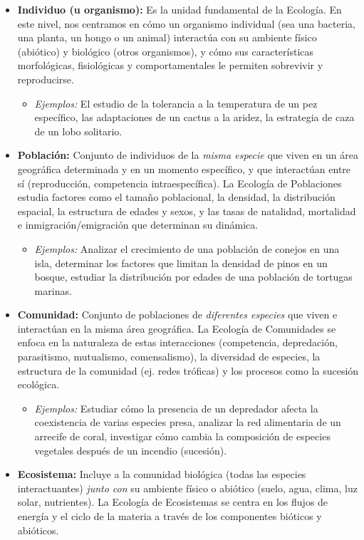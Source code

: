 \documentclass[
]{book}
\providecommand{\tightlist}{%
  \setlength{\itemsep}{0pt}\setlength{\parskip}{0pt}}
\begin{document}
\begin{itemize}
\tightlist
\item
  \textbf{Individuo (u organismo):} Es la unidad fundamental de la Ecología. En este nivel, nos centramos en cómo un organismo individual (sea una bacteria, una planta, un hongo o un animal) interactúa con su ambiente físico (abiótico) y biológico (otros organismos), y cómo sus características morfológicas, fisiológicas y comportamentales le permiten sobrevivir y reproducirse.

  \begin{itemize}
  \tightlist
  \item
    \emph{Ejemplos:} El estudio de la tolerancia a la temperatura de un pez específico, las adaptaciones de un cactus a la aridez, la estrategia de caza de un lobo solitario.
  \end{itemize}
\item
  \textbf{Población:} Conjunto de individuos de la \emph{misma especie} que viven en un área geográfica determinada y en un momento específico, y que interactúan entre sí (reproducción, competencia intraespecífica). La Ecología de Poblaciones estudia factores como el tamaño poblacional, la densidad, la distribución espacial, la estructura de edades y sexos, y las tasas de natalidad, mortalidad e inmigración/emigración que determinan su dinámica.

  \begin{itemize}
  \tightlist
  \item
    \emph{Ejemplos:} Analizar el crecimiento de una población de conejos en una isla, determinar los factores que limitan la densidad de pinos en un bosque, estudiar la distribución por edades de una población de tortugas marinas.
  \end{itemize}
\item
  \textbf{Comunidad:} Conjunto de poblaciones de \emph{diferentes especies} que viven e interactúan en la misma área geográfica. La Ecología de Comunidades se enfoca en la naturaleza de estas interacciones (competencia, depredación, parasitismo, mutualismo, comensalismo), la diversidad de especies, la estructura de la comunidad (ej. redes tróficas) y los procesos como la sucesión ecológica.

  \begin{itemize}
  \tightlist
  \item
    \emph{Ejemplos:} Estudiar cómo la presencia de un depredador afecta la coexistencia de varias especies presa, analizar la red alimentaria de un arrecife de coral, investigar cómo cambia la composición de especies vegetales después de un incendio (sucesión).
  \end{itemize}
\item
  \textbf{Ecosistema:} Incluye a la comunidad biológica (todas las especies interactuantes) \emph{junto con} su ambiente físico o abiótico (suelo, agua, clima, luz solar, nutrientes). La Ecología de Ecosistemas se centra en los flujos de energía y el ciclo de la materia a través de los componentes bióticos y abióticos.


\end{itemize}
\end{document}
